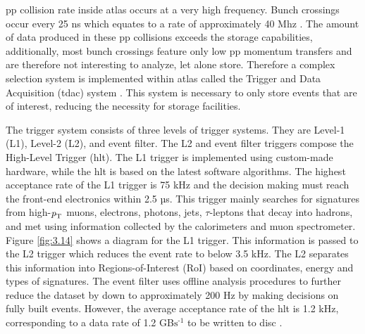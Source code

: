 \gls{pp} collision rate inside \gls{atlas} occurs at a very high frequency. Bunch crossings occur every 25 ns which equates to a rate of approximately 40 Mhz \cite{atlas}.
The amount of data produced in these \gls{pp} collisions exceeds the storage capabilities, additionally, most bunch crossings feature only low \gls{pp} momentum transfers and 
are therefore not interesting to analyze, let alone store. Therefore a complex selection system is implemented within \gls{atlas} called the Trigger and Data Acquisition (\gls{tdac})
system \cite{trigger}. This system is necessary to only store events that are of interest, reducing the necessity for storage facilities. 
\par
The trigger system consists of three levels of trigger systems. They are Level-1 (L1), Level-2 (L2), and event filter. The L2 and event filter triggers compose the 
High-Level Trigger (\gls{hlt}). The L1 trigger is implemented using custom-made hardware, while the \gls{hlt} is based on the latest software algorithms. The highest 
acceptance rate of the L1 trigger is 75 kHz and the decision making must reach the front-end electronics within 2.5 µs. This trigger mainly searches for signatures from 
high-$\textit{\textit{p}}_{\textrm{T}}$ muons, electrons, photons, jets, $\tau$-leptons that decay into hadrons, and \gls{met} using information collected by the calorimeters and muon 
spectrometer. Figure \ref{fig:3.14} shows a diagram for the L1 trigger. This information is passed to the L2 trigger which reduces the event rate to below 3.5 kHz. The L2 separates this information into Regions-of-Interest (RoI) 
based on coordinates, energy and types of signatures. The event filter uses offline analysis procedures to further reduce the dataset by down to approximately 200 Hz by making decisions 
on fully built events. However, the average acceptance rate of the \gls{hlt} is 1.2 kHz, corresponding to a data rate of 1.2 GB$\textrm{s}^{\textrm{-1}}$ to be written to disc \cite{trigger}. 

